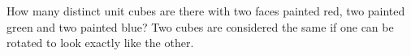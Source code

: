 How many distinct unit cubes are there with two faces painted red, two painted green and two painted blue? Two cubes are considered the same if one can be rotated to look exactly like the other.
